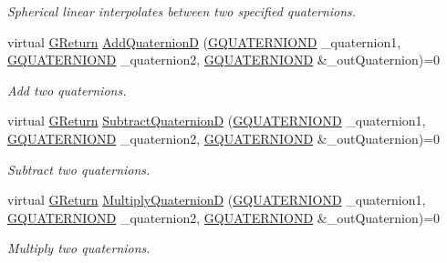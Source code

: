 \begin{DoxyCompactItemize}
\begin{DoxyCompactList}\small\item\em Spherical linear interpolates between two specified quaternions. \end{DoxyCompactList}\item 
virtual \mbox{\hyperlink{namespace_g_w_a67a839e3df7ea8a5c5686613a7a3de21}{G\+Return}} \mbox{\hyperlink{class_g_w_1_1_m_a_t_h_1_1_g_quaternion_a7b2b661a82bd6370567ab2a31c463cea}{Add\+QuaternionD}} (\mbox{\hyperlink{struct_g_w_1_1_m_a_t_h_1_1_g_q_u_a_t_e_r_n_i_o_n_d}{G\+Q\+U\+A\+T\+E\+R\+N\+I\+O\+ND}} \+\_\+quaternion1, \mbox{\hyperlink{struct_g_w_1_1_m_a_t_h_1_1_g_q_u_a_t_e_r_n_i_o_n_d}{G\+Q\+U\+A\+T\+E\+R\+N\+I\+O\+ND}} \+\_\+quaternion2, \mbox{\hyperlink{struct_g_w_1_1_m_a_t_h_1_1_g_q_u_a_t_e_r_n_i_o_n_d}{G\+Q\+U\+A\+T\+E\+R\+N\+I\+O\+ND}} \&\+\_\+out\+Quaternion)=0
\begin{DoxyCompactList}\small\item\em Add two quaternions. \end{DoxyCompactList}\item 
virtual \mbox{\hyperlink{namespace_g_w_a67a839e3df7ea8a5c5686613a7a3de21}{G\+Return}} \mbox{\hyperlink{class_g_w_1_1_m_a_t_h_1_1_g_quaternion_a52f17b2b05d7ffa5176d7e83c40b9ffe}{Subtract\+QuaternionD}} (\mbox{\hyperlink{struct_g_w_1_1_m_a_t_h_1_1_g_q_u_a_t_e_r_n_i_o_n_d}{G\+Q\+U\+A\+T\+E\+R\+N\+I\+O\+ND}} \+\_\+quaternion1, \mbox{\hyperlink{struct_g_w_1_1_m_a_t_h_1_1_g_q_u_a_t_e_r_n_i_o_n_d}{G\+Q\+U\+A\+T\+E\+R\+N\+I\+O\+ND}} \+\_\+quaternion2, \mbox{\hyperlink{struct_g_w_1_1_m_a_t_h_1_1_g_q_u_a_t_e_r_n_i_o_n_d}{G\+Q\+U\+A\+T\+E\+R\+N\+I\+O\+ND}} \&\+\_\+out\+Quaternion)=0
\begin{DoxyCompactList}\small\item\em Subtract two quaternions. \end{DoxyCompactList}\item 
virtual \mbox{\hyperlink{namespace_g_w_a67a839e3df7ea8a5c5686613a7a3de21}{G\+Return}} \mbox{\hyperlink{class_g_w_1_1_m_a_t_h_1_1_g_quaternion_ae75906631438f250ab696aff9e117ede}{Multiply\+QuaternionD}} (\mbox{\hyperlink{struct_g_w_1_1_m_a_t_h_1_1_g_q_u_a_t_e_r_n_i_o_n_d}{G\+Q\+U\+A\+T\+E\+R\+N\+I\+O\+ND}} \+\_\+quaternion1, \mbox{\hyperlink{struct_g_w_1_1_m_a_t_h_1_1_g_q_u_a_t_e_r_n_i_o_n_d}{G\+Q\+U\+A\+T\+E\+R\+N\+I\+O\+ND}} \+\_\+quaternion2, \mbox{\hyperlink{struct_g_w_1_1_m_a_t_h_1_1_g_q_u_a_t_e_r_n_i_o_n_d}{G\+Q\+U\+A\+T\+E\+R\+N\+I\+O\+ND}} \&\+\_\+out\+Quaternion)=0
\begin{DoxyCompactList}\small\item\em Multiply two quaternions. \end{DoxyCompactList}\item 

\end{DoxyCompactItemize}
